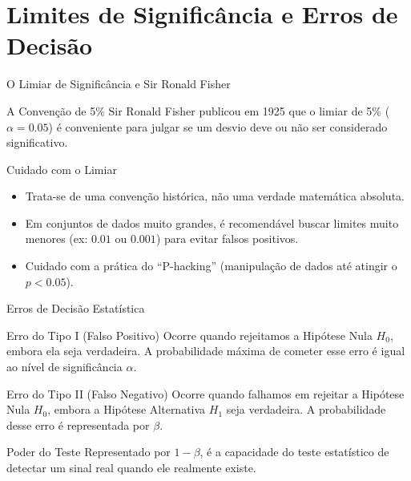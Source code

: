 \section{Limites de Significância e Erros de Decisão}

\begin{frame}{O Limiar de Significância e Sir Ronald Fisher}
    \begin{block}{A Convenção de 5\%}
        Sir Ronald Fisher publicou em 1925 que o limiar de 5\% ($\alpha = 0.05$) é conveniente para julgar se um desvio deve ou não ser considerado significativo.
    \end{block}
    \begin{alertblock}{Cuidado com o Limiar}
        \begin{itemize}
            \item Trata-se de uma convenção histórica, não uma verdade matemática absoluta.
            \item Em conjuntos de dados muito grandes, é recomendável buscar limites muito menores (ex: $0.01$ ou $0.001$) para evitar falsos positivos.
            \item Cuidado com a prática do ``P-hacking'' (manipulação de dados até atingir o $p < 0.05$).
        \end{itemize}
    \end{alertblock}
\end{frame}

\begin{frame}{Erros de Decisão Estatística}
    \begin{block}{Erro do Tipo I (Falso Positivo)}
        Ocorre quando rejeitamos a Hipótese Nula $H_0$, embora ela seja verdadeira. A probabilidade máxima de cometer esse erro é igual ao nível de significância $\alpha$.
    \end{block}
    \begin{block}{Erro do Tipo II (Falso Negativo)}
        Ocorre quando falhamos em rejeitar a Hipótese Nula $H_0$, embora a Hipótese Alternativa $H_1$ seja verdadeira. A probabilidade desse erro é representada por $\beta$.
    \end{block}
    \begin{alertblock}{Poder do Teste}
        Representado por $1 - \beta$, é a capacidade do teste estatístico de detectar um sinal real quando ele realmente existe.
    \end{alertblock}
\end{frame}

